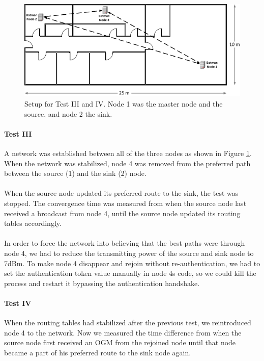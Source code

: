 \begin{figure}[ht!]
  \centering
  \includegraphics{images/lab_setup_room_view_test3-4.png}
  \caption{Setup for Test III and IV. Node 1 was the master node and the source, and node 2 the sink.}
  \label{fig:test_3_4}
\end{figure}

\paragraph{Test III} A network was established between all of the three nodes as shown in Figure \ref{fig:test_3_4}. When the network was stabilized, node 4 was removed from the preferred path between the source (1) and the sink (2) node.
\\\\
When the source node updated its preferred route to the sink, the test was stopped. The convergence time was measured from when the source node last received a broadcast from node 4, until the source node updated its routing tables accordingly.
\\\\
In order to force the network into believing that the best paths were through node 4, we had to reduce the transmitting power of the source and sink node to 7dBm. To make node 4 disappear and rejoin without re-authentication, we had to set the authentication token value manually in node 4s code, so we could kill the process and restart it bypassing the authentication handshake.

\paragraph{Test IV} When the routing tables had stabilized after the previous test, we reintroduced node 4 to the network. Now we measured the time difference from when the source node first received an OGM from the rejoined node until that node became a part of his preferred route to the sink node again.

